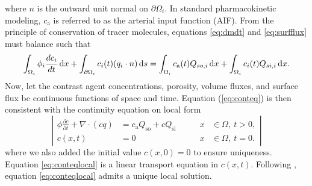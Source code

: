 \documentclass[paper=a4, fontsize=11pt,parskip=half,headings=small]{scrartcl}
\newcommand{\Qso}{Q_{\mathrm{so}}}
\newcommand{\Qsi}{Q_{\mathrm{si}}}
\newcommand{\ca}{c_\mathrm{a}}
\newcommand{\sic}{\milli\mol\per\milli\meter\cubed}
\begin{document}
	where $n$ is the outward unit normal on $\partial \Omega_i$.
	In standard pharmacokinetic modeling, $\ca$ is referred to as the arterial input function (AIF).
	From the principle of conservation of tracer molecules, equations \eqref{eq:dmdt} and \eqref{eq:surfflux} must balance such that
	\begin{equation}
		\int_{\Omega_i} \phi_i \frac{d c_i}{dt} \diffint x + \int_{ \partial \Omega_i}c_i(t)(q_i \cdot n) \diffint s = \int_{\Omega_i}\ca(t)Q_{so,i} \diffint x + \int_{\Omega_i}c_i(t) Q_{si,i} \diffint x.
		\label{eq:conteq}
	\end{equation}
	Now, let the contrast agent concentrations, porosity, volume fluxes, and surface flux be continuous functions of space and time. Equation (\ref{eq:conteq}) is then consistent with the continuity equation on local form
	\begin{equation}
		\left\vert
		\begin{alignedat}{2}
			\phi \frac{\partial c}{\partial t} + \nabla \cdot (cq) &= \ca\Qso + c\Qsi \qquad	&x &\in \Omega, \ t>0,  \\
			c(x,t) &= 0 																			 	&x &\in \Omega, \ t=0.
		\end{alignedat}
		\right\vert
		\label{eq:conteqlocal}
	\end{equation}
	where we also added the initial value $c(x,0) = 0$ to ensure uniqueness.
	Equation \eqref{eq:conteqlocal} is a linear transport equation in $c(x,t)$. 
	Following \cite{evans98}, equation \eqref{eq:conteqlocal} admits a unique local solution.
\end{document}
